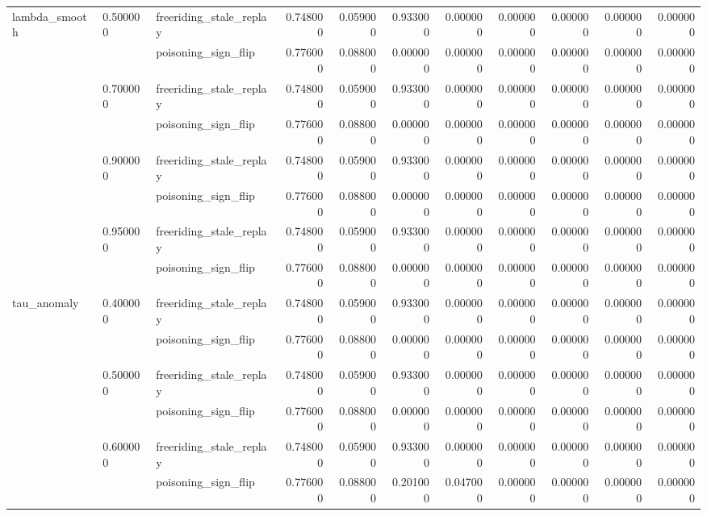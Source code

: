 \begin{tabular}{lllrrrrrrrr}
\cline{1-11} \cline{2-11}
\multirow[t]{8}{*}{lambda_smooth} & \multirow[t]{2}{*}{0.500000} & freeriding_stale_replay & 0.748000 & 0.059000 & 0.933000 & 0.000000 & 0.000000 & 0.000000 & 0.000000 & 0.000000 \\
 &  & poisoning_sign_flip & 0.776000 & 0.088000 & 0.000000 & 0.000000 & 0.000000 & 0.000000 & 0.000000 & 0.000000 \\
\cline{2-11}
 & \multirow[t]{2}{*}{0.700000} & freeriding_stale_replay & 0.748000 & 0.059000 & 0.933000 & 0.000000 & 0.000000 & 0.000000 & 0.000000 & 0.000000 \\
 &  & poisoning_sign_flip & 0.776000 & 0.088000 & 0.000000 & 0.000000 & 0.000000 & 0.000000 & 0.000000 & 0.000000 \\
\cline{2-11}
 & \multirow[t]{2}{*}{0.900000} & freeriding_stale_replay & 0.748000 & 0.059000 & 0.933000 & 0.000000 & 0.000000 & 0.000000 & 0.000000 & 0.000000 \\
 &  & poisoning_sign_flip & 0.776000 & 0.088000 & 0.000000 & 0.000000 & 0.000000 & 0.000000 & 0.000000 & 0.000000 \\
\cline{2-11}
 & \multirow[t]{2}{*}{0.950000} & freeriding_stale_replay & 0.748000 & 0.059000 & 0.933000 & 0.000000 & 0.000000 & 0.000000 & 0.000000 & 0.000000 \\
 &  & poisoning_sign_flip & 0.776000 & 0.088000 & 0.000000 & 0.000000 & 0.000000 & 0.000000 & 0.000000 & 0.000000 \\
\cline{1-11} \cline{2-11}
\multirow[t]{6}{*}{tau_anomaly} & \multirow[t]{2}{*}{0.400000} & freeriding_stale_replay & 0.748000 & 0.059000 & 0.933000 & 0.000000 & 0.000000 & 0.000000 & 0.000000 & 0.000000 \\
 &  & poisoning_sign_flip & 0.776000 & 0.088000 & 0.000000 & 0.000000 & 0.000000 & 0.000000 & 0.000000 & 0.000000 \\
\cline{2-11}
 & \multirow[t]{2}{*}{0.500000} & freeriding_stale_replay & 0.748000 & 0.059000 & 0.933000 & 0.000000 & 0.000000 & 0.000000 & 0.000000 & 0.000000 \\
 &  & poisoning_sign_flip & 0.776000 & 0.088000 & 0.000000 & 0.000000 & 0.000000 & 0.000000 & 0.000000 & 0.000000 \\
\cline{2-11}
 & \multirow[t]{2}{*}{0.600000} & freeriding_stale_replay & 0.748000 & 0.059000 & 0.933000 & 0.000000 & 0.000000 & 0.000000 & 0.000000 & 0.000000 \\
 &  & poisoning_sign_flip & 0.776000 & 0.088000 & 0.201000 & 0.047000 & 0.000000 & 0.000000 & 0.000000 & 0.000000 \\

\end{tabular}
